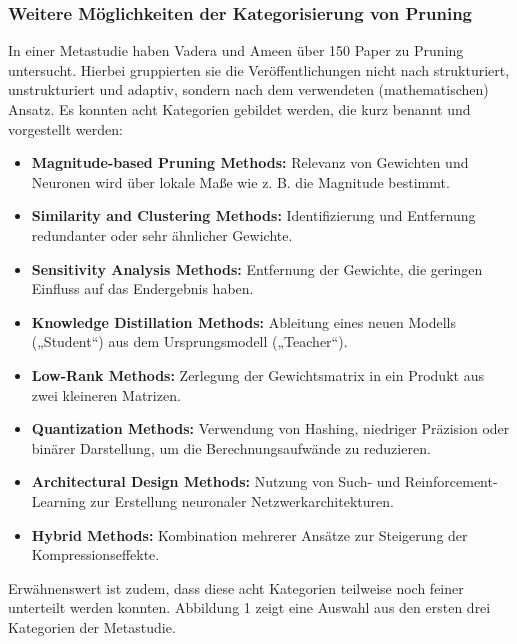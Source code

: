 \subsubsection{Weitere Möglichkeiten der Kategorisierung von Pruning}

In einer Metastudie haben Vadera und Ameen über 150 Paper zu Pruning
untersucht. Hierbei gruppierten sie die Veröffentlichungen nicht nach
strukturiert, unstrukturiert und adaptiv, sondern nach dem verwendeten
(mathematischen) Ansatz. Es konnten acht Kategorien gebildet werden, die kurz
benannt und vorgestellt werden:\autocite[Vgl.][S. 2]{vadera2022methods}

\begin{itemize}
	\item \textbf{Magnitude-based Pruning Methods:} Relevanz von Gewichten und Neuronen wird über lokale Maße wie z. B. die Magnitude bestimmt.
	\item \textbf{Similarity and Clustering Methods:} Identifizierung und Entfernung redundanter oder sehr ähnlicher Gewichte.
	\item \textbf{Sensitivity Analysis Methods:} Entfernung der Gewichte, die geringen Einfluss auf das Endergebnis haben.
	\item \textbf{Knowledge Distillation Methods:} Ableitung eines neuen Modells („Student“) aus dem Ursprungsmodell („Teacher“).
	\item \textbf{Low-Rank Methods:} Zerlegung der Gewichtsmatrix in ein Produkt aus zwei kleineren Matrizen.
	\item \textbf{Quantization Methods:} Verwendung von Hashing, niedriger Präzision oder binärer Darstellung, um die Berechnungsaufwände zu reduzieren.
	\item \textbf{Architectural Design Methods:} Nutzung von Such- und Reinforcement-Learning zur Erstellung neuronaler Netzwerkarchitekturen.
	\item \textbf{Hybrid Methods:} Kombination mehrerer Ansätze zur Steigerung der Kompressionseffekte.
\end{itemize}

Erwähnenswert ist zudem, dass diese acht Kategorien teilweise noch feiner
unterteilt werden konnten. Abbildung 1 zeigt eine Auswahl aus den ersten drei
Kategorien der Metastudie.

